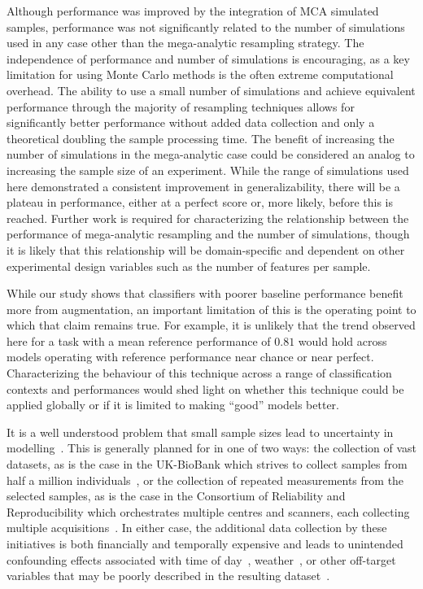 \documentclass[num-refs]{nbdt-article}
\begin{document}
Although performance was improved by the integration of MCA simulated samples, performance was not significantly related to the number of simulations used in any case other than the mega-analytic resampling strategy. The independence of performance and number of simulations is encouraging, as a key limitation for using Monte Carlo methods is the often extreme computational overhead. The ability to use a small number of simulations and achieve equivalent performance through the majority of resampling techniques allows for significantly better performance without added data collection and only a theoretical doubling the sample processing time. The benefit of increasing the number of simulations in the mega-analytic case could be considered an analog to increasing the sample size of an experiment. While the range of simulations used here demonstrated a consistent improvement in generalizability, there will be a plateau in performance, either at a perfect score or, more likely, before this is reached. Further work is required for characterizing the relationship between the performance of mega-analytic resampling and the number of simulations, though it is likely that this relationship will be domain-specific and dependent on other experimental design variables such as the number of features per sample.

While our study shows that classifiers with poorer baseline performance benefit more from augmentation, an important limitation of this is the operating point to which that claim remains true. For example, it is unlikely that the trend observed here for a task with a mean reference performance of $0.81$ would hold across models operating with reference performance near chance or near perfect. Characterizing the behaviour of this technique across a range of classification contexts and performances would shed light on whether this technique could be applied globally or if it is limited to making ``good'' models better.

It is a well understood problem that small sample sizes lead to uncertainty in modelling~\cite{varoquaux2018cross}. This is generally planned for in one of two ways: the collection of vast datasets, as is the case in the UK-BioBank which strives to collect samples from half a million individuals~\cite{sudlow2015uk}, or the collection of repeated measurements from the selected samples, as is the case in the Consortium of Reliability and Reproducibility which orchestrates multiple centres and scanners, each collecting multiple acquisitions~\cite{zuo2014open}. In either case, the additional data collection by these initiatives is both financially and temporally expensive and leads to unintended confounding effects associated with time of day~\cite{vandewalle2009functional}, weather~\cite{di2019estimations}, or other off-target variables that may be poorly described in the resulting dataset~\cite{chaddock2010neuroimaging}.
\end{document}
